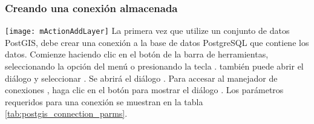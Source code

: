\subsubsection{Creando una conexi\'on almacenada}\label{sec:postgis_stored}

\texttt{[image: mActionAddLayer]} La primera vez que utilize un conjunto de datos PostGIS, debe crear una conexi\'on a la base de datos PostgreSQL que contiene los datos. Comienze haciendo clic en el bot\'on  de la barra de herramientas, seleccionando la opci\'on 
 del men\'u  o presionando la tecla . también puede abrir el di\'alogo  y seleccionar .
Se abrir\'a el di\'alogo . Para accesar al manejador de conexiones , haga clic en el bot\'on  para mostrar el di\'alogo  . Los par\'ametros requeridos para una conexi\'on se muestran en la tabla \ref{tab:postgis_connection_parms}.

